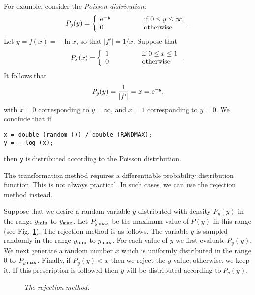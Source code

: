 For example, consider the {\em Poisson distribution}:
\begin{equation}
P_y(y) = \left\{\begin{array}{lcl}
{\rm e}^{-y}&\mbox{\hspace{1cm}}&\mbox{if $0 \leq y \leq \infty$}\\
0&& \mbox{otherwise}
\end{array}
\right..
\end{equation}
Let $y=f(x)=-\ln x$, so that $|f'| = 1/x$. Suppose that
\begin{equation}
P_x(x) = \left\{\begin{array}{lcl}
1&\mbox{\hspace{1cm}}&\mbox{if $0 \leq x \leq 1$}\\
0&& \mbox{otherwise}
\end{array}
\right..
\end{equation}
It follows that
\begin{equation}
P_y(y) = \frac{1}{|f'|}= x = {\rm e}^{-y},
\end{equation}
with $x=0$ corresponding to $y=\infty$, and $x=1$ corresponding to $y=0$. We conclude that
if
{\small\begin{verbatim}
x = double (random ()) / double (RANDMAX);
y = - log (x);
\end{verbatim}}
\noindent then {\tt y} is distributed according to the Poisson distribution.

The transformation method requires a differentiable probability distribution function. This is
not always practical. In such cases, we can use the rejection method instead.

Suppose that we desire a random variable $y$ distributed with density $P_y(y)$ in the
range $y_{\rm min}$ to $y_{\rm max}$. Let $P_{y\,{\rm max}}$ be the maximum value of $P(y)$ in this range (see
Fig.~\ref{rej}).
The rejection method is as follows. The variable $y$ is sampled randomly in the range $y_{\rm min}$
 to $y_{\rm max}$. 
For each value of $y$ we first evaluate $P_y(y)$. We next generate a random number $x$ which is
uniformly distributed in the range 0 to $P_{y\,{\rm max}}$. Finally, if $P_y(y) < x$ then we reject
the $y$ value; otherwise, we keep it. If this prescription is followed then $y$ will
be distributed according to $P_y(y)$.

\begin{figure}
\epsfysize=2.5in
\centerline{}
\caption{\em The rejection method.}\label{rej}
\end{figure}

